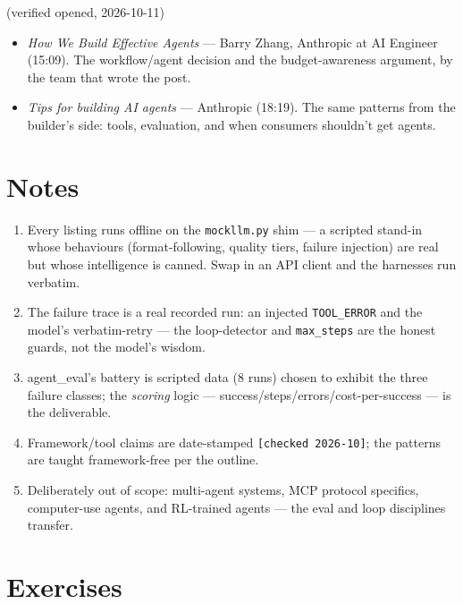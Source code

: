 \begin{rulebox}
(verified opened, 2026-10-11)
\begin{itemize}
\item \emph{How We Build Effective Agents} --- Barry Zhang,
Anthropic at AI Engineer (15:09). The workflow/agent decision and
the budget-awareness argument, by the team that wrote the post.
\item \emph{Tips for building AI agents} --- Anthropic (18:19).
The same patterns from the builder's side: tools, evaluation,
and when consumers shouldn't get agents.
\end{itemize}
\end{rulebox}

\section*{Notes}
\begin{enumerate}
\item[\textbf{1.}] Every listing runs offline on the
\texttt{mockllm.py} shim --- a scripted stand-in whose behaviours
(format-following, quality tiers, failure injection) are real but
whose intelligence is canned. Swap in an API client and the
harnesses run verbatim.
\item[\textbf{2.}] The failure trace is a real recorded run: an
injected \texttt{TOOL\_ERROR} and the model's verbatim-retry ---
the loop-detector and \texttt{max\_steps} are the honest guards,
not the model's wisdom.
\item[\textbf{3.}] agent\_eval's battery is scripted data (8 runs)
chosen to exhibit the three failure classes; the \emph{scoring}
logic --- success/steps/errors/cost-per-success --- is the
deliverable.
\item[\textbf{4.}] Framework/tool claims are date-stamped
\texttt{[checked 2026-10]}; the patterns are taught framework-free
per the outline.
\item[\textbf{5.}] Deliberately out of scope: multi-agent systems,
MCP protocol specifics, computer-use agents, and RL-trained agents
--- the eval and loop disciplines transfer.
\end{enumerate}

\section{Exercises}
\label{sec:agentex}

